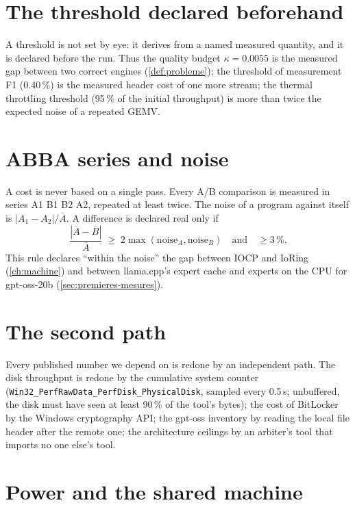 \section{The threshold declared beforehand}

A threshold is not set by eye: it derives from a named measured quantity, and it is declared before the run. Thus the quality budget $\kappa = 0.0055$ is the measured gap between two correct engines (\cref{def:probleme}); the threshold of measurement F1 (0.40\,\%) is the measured header cost of one more stream; the thermal throttling threshold (95\,\% of the initial throughput) is more than twice the expected noise of a repeated GEMV.

\section{ABBA series and noise}\label{sec:protocole-abba}

A cost is never based on a single pass. Every A/B comparison is measured in series A1 B1 B2 A2, repeated at least twice. The noise of a program against itself is $|A_1 - A_2|/\overline{A}$. A difference is declared real only if
\[
\frac{|\overline{A} - \overline{B}|}{\overline{A}} \;\ge\; 2 \max(\text{noise}_A, \text{noise}_B) \quad \text{and} \quad \ge 3\,\% .
\]
This rule declares ``within the noise'' the gap between IOCP and IoRing (\cref{ch:machine}) and between llama.cpp's expert cache and experts on the CPU for gpt-oss-20b (\cref{sec:premieres-mesures}).

\section{The second path}

Every published number we depend on is redone by an independent path. The disk throughput is redone by the cumulative system counter (\texttt{Win32\_PerfRawData\_PerfDisk\_PhysicalDisk}, sampled every 0.5\,s; unbuffered, the disk must have seen at least 90\,\% of the tool's bytes); the cost of BitLocker by the Windows cryptography API; the gpt-oss inventory by reading the local file header after the remote one; the architecture ceilings by an arbiter's tool that imports no one else's tool.

\section{Power and the shared machine}\label{sec:protocole-alimentation}

